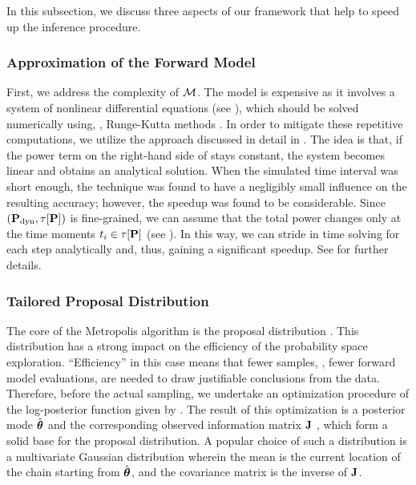 In this subsection, we discuss three aspects of our framework that help to speed up the inference procedure.

\subsubsection{Approximation of the Forward Model} 
First, we address the complexity of $\model$. The model is expensive as it involves a system of nonlinear differential equations (see ), which should be solved numerically using, \eg, Runge-Kutta methods \cite{press2007}. In order to mitigate these repetitive computations, we utilize the approach discussed in detail in \cite{ukhov2012}.
The idea is that, if the power term on the right-hand side of  stays constant, the system becomes linear and obtains an analytical solution. When the simulated time interval was short enough, the technique was found to have a negligibly small influence on the resulting accuracy; however, the speedup was found to be considerable.
Since $(\mathbf{P}_{\text{dyn}}, \tau[\mathbf{P}])$ is fine-grained, we can assume that the total power changes only at the time moments $t_i \in \tau[\mathbf{P}]$ (see ). In this way, we can stride in time solving  for each step analytically and, thus, gaining a significant speedup. See \cite{ukhov2012} for further details.

\subsubsection{Tailored Proposal Distribution} 
The core of the Metropolis algorithm is the proposal distribution \cite{gelman2004}. This distribution has a strong impact on the efficiency of the probability space exploration. ``Efficiency'' in this case means that fewer samples, \ie, fewer forward model evaluations, are needed to draw justifiable conclusions from the data.
Therefore, before the actual sampling, we undertake an optimization procedure of the log-posterior function given by . The result of this optimization is a posterior mode $\hat{{\boldsymbol\theta}}$ and the corresponding observed information matrix $\mathbf{J}$ \cite{gelman2004}, which form a solid base for the proposal distribution.
A popular choice of such a distribution is a multivariate Gaussian distribution wherein the mean is the current location of the chain starting from $\hat{{\boldsymbol\theta}}$, and the covariance matrix is the inverse of $\mathbf{J}$.

